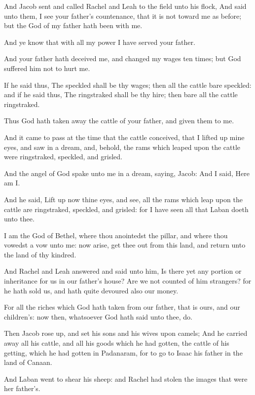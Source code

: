 \verse And Jacob sent and called Rachel and Leah to the field unto his flock, \verse And said unto them, I see your father's countenance, that it is not toward me as before; but the God of my father hath been with me.

\verse And ye know that with all my power I have served your father.

\verse And your father hath deceived me, and changed my wages ten times; but God suffered him not to hurt me.

\verse If he said thus, The speckled shall be thy wages; then all the cattle bare speckled: and if he said thus, The ringstraked shall be thy hire; then bare all the cattle ringstraked.

\verse Thus God hath taken away the cattle of your father, and given them to me.

\verse And it came to pass at the time that the cattle conceived, that I lifted up mine eyes, and saw in a dream, and, behold, the rams which leaped upon the cattle were ringstraked, speckled, and grisled.

\verse And the angel of God spake unto me in a dream, saying, Jacob: And I said, Here am I.

\verse And he said, Lift up now thine eyes, and see, all the rams which leap upon the cattle are ringstraked, speckled, and grisled: for I have seen all that Laban doeth unto thee.

\verse I am the God of Bethel, where thou anointedst the pillar, and where thou vowedst a vow unto me: now arise, get thee out from this land, and return unto the land of thy kindred.

\verse And Rachel and Leah answered and said unto him, Is there yet any portion or inheritance for us in our father's house?  \verse Are we not counted of him strangers? for he hath sold us, and hath quite devoured also our money.

\verse For all the riches which God hath taken from our father, that is ours, and our children's: now then, whatsoever God hath said unto thee, do.

\verse Then Jacob rose up, and set his sons and his wives upon camels; \verse And he carried away all his cattle, and all his goods which he had gotten, the cattle of his getting, which he had gotten in Padanaram, for to go to Isaac his father in the land of Canaan.

\verse And Laban went to shear his sheep: and Rachel had stolen the images that were her father's.

